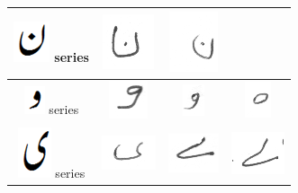 \documentclass[a4paper,conference]{IEEEtran}
\begin{document}
\begin{table}[h]
\begin{tabular}{@{}cccc@{}}
\hline
\includegraphics[scale=0.15]{noon_orig} series & \includegraphics[scale=0.15]{143} & \includegraphics[scale=0.15]{144} &  \\
\hline
\includegraphics[scale=0.15]{wao_orig} series & \includegraphics[scale=0.15]{145} & \includegraphics[scale=0.15]{146}  & 
\includegraphics[scale=0.15]{147} \\
\hline
\includegraphics[scale=0.15]{choti_ye_orig} series & \includegraphics[scale=0.15]{148} & \includegraphics[scale=0.15]{149} & 
\includegraphics[scale=0.15]{150} \\
\hline
 \end{tabular}
\end{table}
\end{document}
